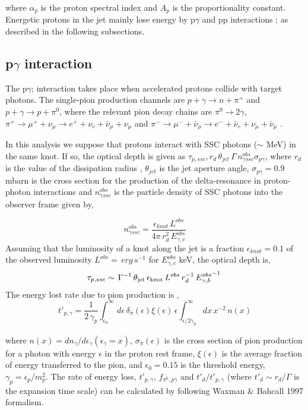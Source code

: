 \documentclass[preprint, twocolumn,secnumarabic,amssymb, nobibnotes, aps, prd]{revtex4-1}
\newcommand{\be}{\begin{equation}}
\newcommand{\ee}{\end{equation}}
\begin{document}
\noindent where $\alpha_p$ is the proton spectral index and $A_p$ is the proportionality constant.   Energetic protons in the jet mainly lose energy   by p$\gamma$  and pp interactions  \citep{ber90,bec09,ato03}; as described  in the following subsections. 
 

\subsection{p$\gamma$ interaction}

 The p$\gamma$; interaction takes place when accelerated protons collide with  target photons.  The single-pion production channels are $p+\gamma\to n+\pi^+$ and $p+\gamma\to p+ \pi^0$, where the relevant pion decay chains are $\pi^0\to 2\gamma$, $\pi^+\to \mu^++\nu_\mu\to e^++\nu_e+\bar{\nu}_\mu+\nu_\mu$ and $\pi^-\to \mu^-+\bar{\nu}_\mu\to e^-+\bar{\nu}_e+\nu_\mu+\bar{\nu}_\mu$ \citep{ato03}.


In this analysis we suppose  that protons interact with SSC photons ($\sim$ MeV) in the same knot. If so, the optical depth is given as $\tau_{p,ssc}, r_d\,\theta_{jet}\,\Gamma\, n^{obs}_{\gamma ssc} \sigma_{p\gamma}$, where  $r_d$ is the value of the dissipation radius \citep{bat03}, $\theta_{jet}$ is the jet aperture angle, $\sigma_{p\gamma}=0.9$ mbarn is the cross section  for the production of the delta-resonance in proton-photon interactions and  $n^{obs}_{\gamma ssc}$ is the particle density of SSC photons  into the observer frame \citep{bec09} given by,

\be
n^{obs}_{\gamma ssc}=\frac{\epsilon_{knot}\, L^{obs}}{4\pi\,r^2_d\,E^{obs}_{\gamma,c}}
\ee
Assuming that the luminosity of a knot along the jet is a fraction $\epsilon_{knot}=0.1$ of the observed luminosity $L^{obs}=\,erg\,s^{-1}$ for $E^{obs}_{\gamma,c}$ keV, the optical depth is,
\be
\tau_{p,ssc}\sim\,\Gamma^{-1}\,\theta_{\rm{jet}}\,\epsilon_{\rm{knot}}\,L^{obs} \, r_d^{-1}\, {E^{obs}_{\gamma,b}}^{-1}\,
\ee
The energy lost rate due to pion production is \citep{ste68, ber90},
\begin{equation}
t'_{p,\gamma}=\frac{1}{2\,\gamma_p}\int^\infty_{\epsilon_0}\,d\epsilon\,\delta_\pi(\epsilon)\xi(\epsilon)\,\epsilon\int^\infty_{\epsilon/2\gamma_p}dx\, x^{-2}\,n(x)
\end{equation}

\indent where $n(x)=dn_\gamma/d\epsilon_\gamma (\epsilon_\gamma=x)$, $\sigma_\pi(\epsilon)$ is the cross section of pion production for a photon with energy $\epsilon$ in the proton rest frame, $\xi(\epsilon)$ is the average fraction of energy transferred to the pion,  and $\epsilon_0=0.15$ is the threshold energy, $\gamma_p=\epsilon_p/m^2_p$. The rate of energy loss,  $t'_{p,\gamma}$, $f_{\pi^0,p \gamma}$ and $t'_d/t'_{p,\gamma}$  (where $t'_d\sim r_d/\Gamma$ is the expansion time scale) can  be calculated by following Waxman \& Bahcall 1997 formalism.
\end{document}

